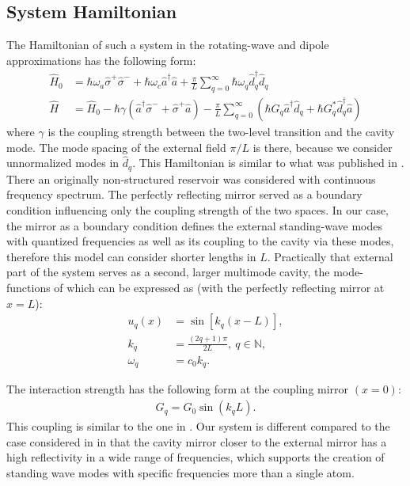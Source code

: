 \documentclass[11pt, a4paper]{article}
\def\aop{\hat{a}}
\def\adop{\hat{a}^\dagger}
\def\dop{\hat{d}}
\def\ddop{\hat{d}^\dagger}
\def\sigop{\hat{\sigma}^-}
\def\sigdop{\hat{\sigma}^+}
\def\Hop{\hat{H}}
\def\nn{\nonumber}
\newcommand{\lsz}{\left[}
\newcommand{\rsz}{\right]}
\newcommand{\lk}{\left(}
\newcommand{\rk}{\right)}
\begin{document}
\subsection{System Hamiltonian}
The Hamiltonian of such a system in the rotating-wave and dipole approximations has the following form:
\begin{align}
\Hop_0 &= \hbar\omega_a\sigdop\sigop + \hbar\omega_c\adop\aop + \frac{\pi}{L}\sum_{q=0}^\infty\hbar\omega_q\ddop_q\dop_q\nn\\
\Hop &= \Hop_0 - \hbar\gamma\lk\adop\sigop + \sigdop\aop\rk - \frac{\pi}{L}\sum_{q=0}^\infty\lk\hbar G_q\adop\dop_q + \hbar G^*_q\ddop_q\aop\rk\nn
\end{align}
where $\gamma$ is the coupling strength between the two-level transition and the cavity mode. The mode spacing of the external field $\pi/L$ is there, because we consider unnormalized modes in $\dop_q$. This Hamiltonian is similar to what was published in \cite{Kabuss2015}. There an originally non-structured reservoir was considered with continuous frequency spectrum. The perfectly reflecting mirror served as a boundary condition influencing only the coupling strength of the two spaces. In our case, the mirror as a boundary condition defines the external standing-wave modes with quantized frequencies as well as its coupling to the cavity via these modes, therefore this model can consider shorter lengths in $L$. Practically that external part of the system serves as a second, larger multimode cavity, the mode-functions of which can be expressed as (with the perfectly reflecting mirror at $x=L$):
\begin{align}
u_q(x) &= \sin{\lsz k_q(x-L)\rsz},\nn\\
k_q &=\frac{(2q+1)\pi}{2L},\  q\in\mathbb{N},\nn\\
\omega_q & = c_0k_q.
\end{align}

The interaction strength has the following form at the coupling mirror $(x=0)$:
\begin{align}
G_q = G_0\sin{(k_qL)}.
\end{align}
This coupling is similar to the one in \cite{Kabuss2015,Dorner2002}. Our system is different compared to the case considered in \cite{Dorner2002} in that the cavity mirror closer to the external mirror has a high reflectivity in a wide range of frequencies, which supports the creation of standing wave modes with specific frequencies more than a single atom. 
\end{document}
